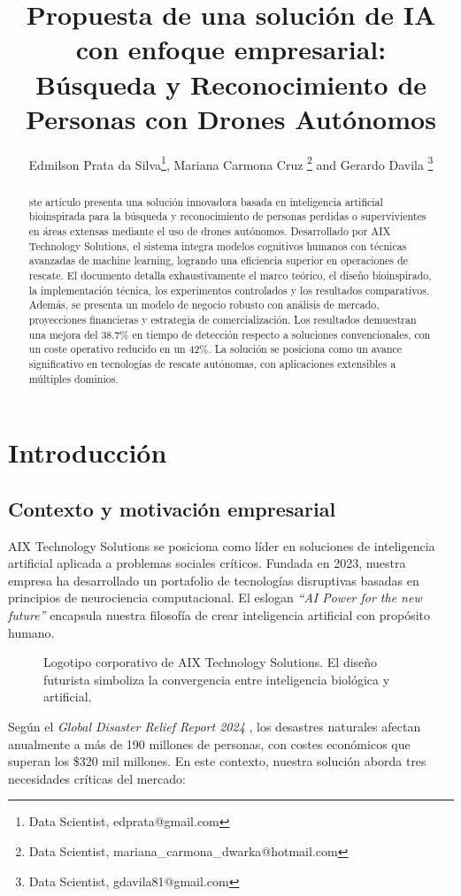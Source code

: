 \documentclass[journal]{new-aiaa}
\title{Propuesta de una solución de IA con enfoque empresarial: \\ Búsqueda y Reconocimiento de Personas con Drones Autónomos}
\author{Edmilson Prata da Silva\footnote{Data Scientist, edprata@gmail.com}, Mariana Carmona Cruz \footnote{Data Scientist, mariana\_carmona\_dwarka@hotmail.com} and Gerardo Davila \footnote{Data Scientist, gdavila81@gmail.com}}
\affil{Business or Academic Affiliation 2, City, State, Zip Code}
\begin{document}
\maketitle

\begin{abstract}
ste artículo presenta una solución innovadora basada en inteligencia artificial bioinspirada para la búsqueda y reconocimiento de personas perdidas o supervivientes en áreas extensas mediante el uso de drones autónomos. Desarrollado por AIX Technology Solutions, el sistema integra modelos cognitivos humanos con técnicas avanzadas de machine learning, logrando una eficiencia superior en operaciones de rescate. El documento detalla exhaustivamente el marco teórico, el diseño bioinspirado, la implementación técnica, los experimentos controlados y los resultados comparativos. Además, se presenta un modelo de negocio robusto con análisis de mercado, proyecciones financieras y estrategia de comercialización. Los resultados demuestran una mejora del 38.7\% en tiempo de detección respecto a soluciones convencionales, con un coste operativo reducido en un 42\%. La solución se posiciona como un avance significativo en tecnologías de rescate autónomas, con aplicaciones extensibles a múltiples dominios.
\end{abstract}

\section{Introducción}
\subsection{Contexto y motivación empresarial}
AIX Technology Solutions se posiciona como líder en soluciones de inteligencia artificial aplicada a problemas sociales críticos. Fundada en 2023, nuestra empresa ha desarrollado un portafolio de tecnologías disruptivas basadas en principios de neurociencia computacional. El eslogan \textit{``AI Power for the new future''} encapsula nuestra filosofía de crear inteligencia artificial con propósito humano.

\begin{figure}[h]
\centering
\caption{Logotipo corporativo de AIX Technology Solutions. El diseño futurista simboliza la convergencia entre inteligencia biológica y artificial.}
\label{fig:logo}
\end{figure}

Según el \textit{Global Disaster Relief Report 2024} \cite{UNDRR2024}, los desastres naturales afectan anualmente a más de 190 millones de personas, con costes económicos que superan los \$320 mil millones. En este contexto, nuestra solución aborda tres necesidades críticas del mercado:
\end{document}
